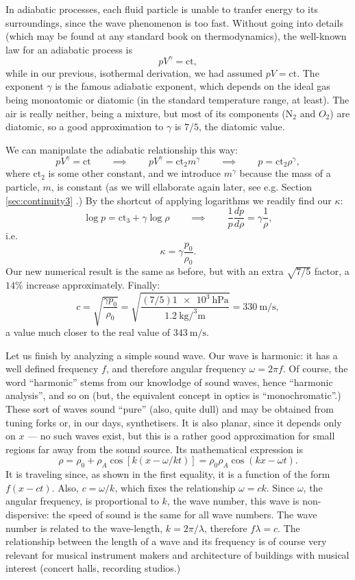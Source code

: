 In adiabatic processes, each fluid particle is unable to tranfer
energy to its surroundings, since the wave phenomenon is too
fast. Without going into details (which may be found at any standard
book on thermodynamics), the well-known law for an adiabatic process is
\[
p V^\gamma = \mathrm{ct} ,
\]
while in our previous, isothermal derivation, we had assumed $ p V =
\mathrm{ct} $. The exponent $\gamma$ is the famous adiabatic exponent,
which depends on the ideal gas being monoatomic or diatomic (in the
standard temperature range, at least). The air is really neither,
being a mixture, but most of its components (N$_2$ and $O_2$) are
diatomic, so a good approximation to $\gamma$ is $7/5$, the diatomic
value.

We can manipulate the adiabatic relationship this way:
\[
p V^\gamma = \mathrm{ct} \qquad\implies\qquad
p V^\gamma = \mathrm{ct}_2 m^\gamma \qquad\implies\qquad
p = \mathrm{ct}_2 \rho^\gamma ,
\]
where $\mathrm{ct}_2$ is some other constant, and we introduce
$m^\gamma$ because the mass of a particle, $m$, is constant (as we
will ellaborate again later, see e.g. Section \ref{sec:continuity3} .)
By the shortcut of applying logarithms we readily find our $\kappa$:
\[
\log p = \mathrm{ct}_3 + \gamma \log \rho  \qquad\implies\qquad
\frac{1}{ p }
\frac{d p}{d\rho}=  \gamma \frac{1}{\rho} ,
\]
i.e.
\[
\kappa = \gamma \frac{p_0}{\rho_0} .
\]
Our new numerical result is the same as before, but with
an extra $\sqrt{7/5}$ factor, a $14\%$ increase approximately.
Finally:
\[
c= \sqrt{\frac{\gamma p_0 }{ \rho_0 }} =
\sqrt{\frac%
  { (7/5)  \SI{1e3}{\hecto\pascal} }%
  {\SI{1.2}{\kilo\gram\per\cubed\meter}}} =
\SI{330}{\meter\per\second} ,
\]
a value much closer to the real value of $\SI{343}{\meter\per\second} $.

Let us finish by analyzing a simple sound wave. Our wave is harmonic:
it has a well defined frequency $f$, and therefore angular frequency
$\omega=2\pi f$. Of course, the word ``harmonic'' stems from our
knowlodge of sound waves, hence ``harmonic analysis'', and so on (but,
the equivalent concept in optics is ``monochromatic''.) These sort of
waves sound ``pure'' (also, quite dull) and may be obtained from
tuning forks or, in our days, synthetisers. It is also planar, since
it depends only on $x$ --- no such waves exist, but this is a rather
good approximation for small regions far away from the sound source.
Its mathematical expression is
\[
\rho = \rho_0 +  \rho_A \cos[ k ( x  - \omega/k  t) ]
= \rho_0 \rho_A \cos(k x  - \omega t) .
\]
It is traveling since, as shown in the first equality, it is a
function of the form $f(x-ct)$. Also, $c= \omega/k$, which fixes the
relationship $\omega = c k$. Since $\omega$, the angular frequency, is
proportional to $k$, the wave number, this wave is non-dispersive: the
speed of sound is the same for all wave numbers. The wave number is
related to the wave-length, $k=2\pi/\lambda$, therefore $f \lambda =
c$. The relationship between the length of a wave and its frequency is
of course very relevant for musical instrument makers and architecture
of buildings with musical interest (concert halls, recording studios.)

